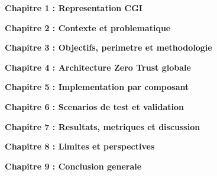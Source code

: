 \documentclass[12pt,a4paper,twoside]{report}
\newcommand{\chapterpage}[1]{%
  \clearpage
  \thispagestyle{empty}
  \vspace*{\fill}
  \begin{flushleft}
    {\huge\bfseries #1}
  \end{flushleft}
  \vspace*{\fill}
  \clearpage
}
\begin{document}






\clearpage
\setcounter{tocdepth}{1}
\setcounter{secnumdepth}{3}
\tableofcontents
\clearpage

\listoffigures
\clearpage

\listoftables
\clearpage

\setcounter{page}{1}

\chapterpage{Chapitre 1 : Representation CGI}

\chapterpage{Chapitre 2 : Contexte et problematique}

\chapterpage{Chapitre 3 : Objectifs, perimetre et methodologie}

\chapterpage{Chapitre 4 : Architecture Zero Trust globale}

\chapterpage{Chapitre 5 : Implementation par composant}

\chapterpage{Chapitre 6 : Scenarios de test et validation}

\chapterpage{Chapitre 7 : Resultats, metriques et discussion}

\chapterpage{Chapitre 8 : Limites et perspectives}

\chapterpage{Chapitre 9 : Conclusion generale}

\end{document}
